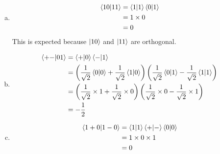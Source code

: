 \documentclass[12pt]{extarticle}
\begin{document}
\begin{enumerate}[(a)]
\item
\begin{align*}
\innerproduct{10}{11} & = \innerproduct{1}{1}\innerproduct{0}{1} \\
& = 1\times 0 \\
& = 0
\end{align*}
This is expected because $\ket{10}$ and $\ket{11}$ are orthogonal.
\item
\begin{align*}
\innerproduct{+-}{01} & = \innerproduct{+}{0}\innerproduct{-}{1} \\
& = \left(\istwo\innerproduct{0}{0} + \istwo\innerproduct{1}{0}\right) \left(\istwo\innerproduct{0}{1} - \istwo\innerproduct{1}{1}\right) \\
& = \left(\istwo\times 1 + \istwo\times 0\right) \left(\istwo\times 0 - \istwo\times 1\right) \\
& = -\frac{1}{2}
\end{align*}

\item
\begin{align*}
\innerproduct{1+0}{1-0} & = \innerproduct{1}{1} \innerproduct{+}{-} \innerproduct{0}{0} \\
& = 1 \times 0 \times 1 \\
& = 0
\end{align*}
\end{enumerate}
\end{document}
